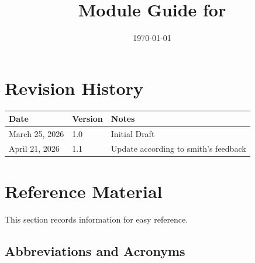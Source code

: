 \documentclass[12pt, titlepage]{article}
\begin{document}
\title{Module Guide for \progname{}} 
\author{\authname}
\date{\today}

\maketitle


\section{Revision History}

\begin{tabularx}{\textwidth}{p{3cm}p{2cm}X}
\toprule {\bf Date} & {\bf Version} & {\bf Notes}\\
\midrule
March 25, 2026 & 1.0 & Initial Draft\\
April 21, 2026 & 1.1 & Update according to smith's feedback\\
\bottomrule
\end{tabularx}

\newpage

\section{Reference Material}

This section records information for easy reference. 

\subsection{Abbreviations and Acronyms}
\end{document}
